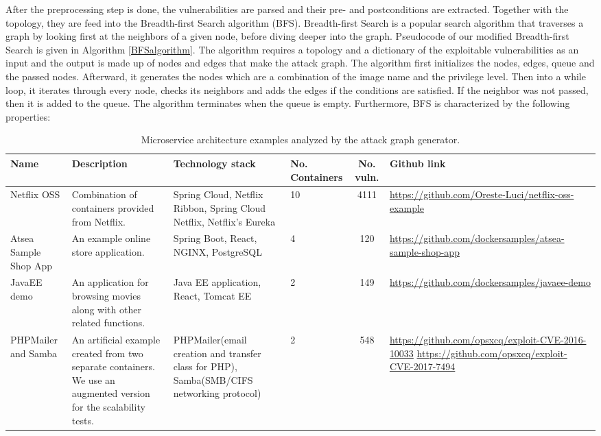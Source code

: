 After the preprocessing step is done, the vulnerabilities are parsed and their pre- and postconditions are extracted. Together with the topology, they are feed into the Breadth-first Search algorithm (BFS).
Breadth-first Search is a popular search algorithm that traverses a graph by looking first at the neighbors of a given node, before diving deeper into the graph. Pseudocode of our modified Breadth-first Search is given in Algorithm \ref{BFSalgorithm}. The algorithm requires a topology and a dictionary of the exploitable vulnerabilities as an input and the output is made up of nodes and edges that make the attack graph. The algorithm first initializes the nodes, edges, queue and the passed nodes. Afterward, it generates the nodes which are a combination of the image name and the privilege level. Then into a while loop, it iterates through every node, checks its neighbors and adds the edges if the conditions are satisfied. If the neighbor was not passed, then it is added to the queue. The algorithm terminates when the queue is empty. Furthermore, BFS is characterized by the following properties:

\begin{table}[t]
	\begin{center}
		\begin{tabular}{ p{20mm}p{35mm}p{35mm}p{10mm}cp{35mm} } 
			\hline
			Name & Description & Technology stack & No. Containers & No. vuln. & Github link \\\hline 
			
			Netflix OSS & Combination of containers provided from Netflix. & Spring Cloud, Netflix Ribbon, Spring Cloud Netflix, Netflix's Eureka & 10 & 4111 & \url{https://github.com/Oreste-Luci/netflix-oss-example} \\
			
			Atsea Sample Shop App & An example online store application. & Spring Boot, React, NGINX, PostgreSQL & 4 & 120 & \url{https://github.com/dockersamples/atsea-sample-shop-app} \\
			
			JavaEE demo & An application for browsing movies along with other related functions. & Java EE application, React, Tomcat EE & 2 & 149 & \url{https://github.com/dockersamples/javaee-demo} \\
			
			PHPMailer and Samba & An artificial example created from two separate containers. We use an augmented version for the scalability tests. & PHPMailer(email creation and transfer class for PHP), Samba(SMB/CIFS networking protocol) & 2 & 548 &  \url{https://github.com/opsxcq/exploit-CVE-2016-10033}
			\url{https://github.com/opsxcq/exploit-CVE-2017-7494} \\
			
			
			\hline
		\end{tabular}
	\end{center}
	
	\caption{Microservice architecture examples analyzed by the attack graph generator.}
	\label{table_technologies}
	
\end{table}

